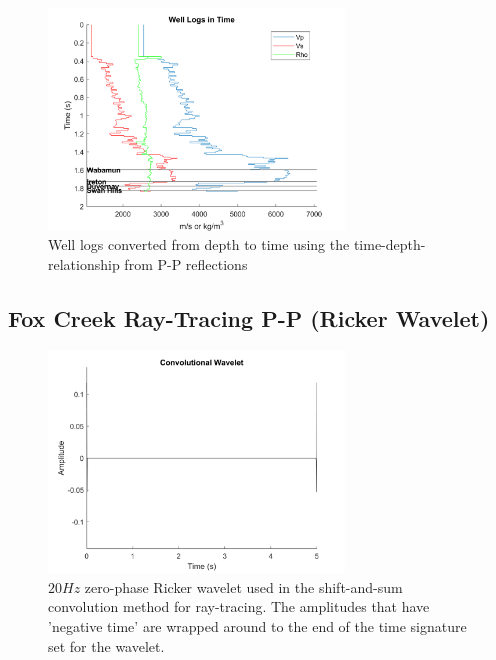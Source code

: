 \documentclass[12pt]{article}
\begin{document}
\begin{figure}[!htb]
	\centering
	\includegraphics[width=0.7\textwidth]{Figures/RTCtimelogsPP.png}
	\caption[Fox Creek ray-tracing P-P well logs in time]{Well logs converted from depth to time using the time-depth-relationship from P-P reflections}
	\label{fig:RTCtimelogsPP}
\end{figure}
\FloatBarrier

\subsection{Fox Creek Ray-Tracing P-P (Ricker Wavelet)}
\begin{figure}[!htb]
	\centering
	\includegraphics[width=0.7\textwidth]{Figures/RTCricker.png}
	\caption[Fox Creek Ricker wavelet]{$20 Hz$ zero-phase Ricker wavelet used in the shift-and-sum convolution method for ray-tracing. The amplitudes that have 'negative time' are wrapped around to the end of the time signature set for the wavelet.}
	\label{fig:RTCricker}
\end{figure}
\end{document}
